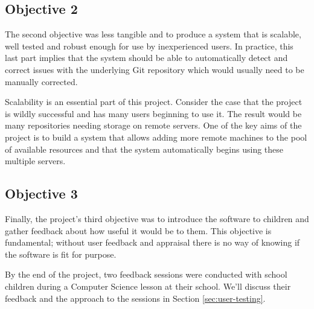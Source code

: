 \subsection{Objective 2} 

The second objective was less tangible and to produce a system that is scalable, well tested and robust enough for use by inexperienced users. In practice, this last part implies that the system should be able to automatically detect and correct issues with the underlying Git repository which would usually need to be manually corrected.

Scalability is an essential part of this project. Consider the case that the project is wildly successful and has many users beginning to use it. The result would be many repositories needing storage on remote servers. One of the key aims of the project is to build a system that allows adding more remote machines to the pool of available resources and that the system automatically begins using these multiple servers.

\subsection{Objective 3}

Finally,  the project's third objective was to introduce the software to children and gather feedback about how useful it would be to them. This objective is fundamental; without user feedback and appraisal there is no way of knowing if the software is fit for purpose.

By the end of the project, two feedback sessions were conducted with school children during a Computer Science lesson at their school. We'll discuss their feedback and the approach to the sessions in Section \ref{sec:user-testing}.
